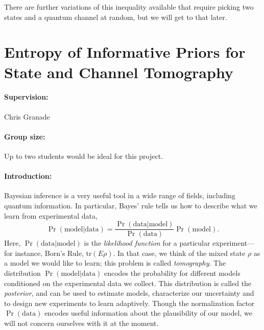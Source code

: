\documentclass[aps,pra,onecolumn,nofootinbib,superscriptaddress,tightenlines,
notitlepage,12pt]{revtex4-1}
\newcommand{\tr}{\mathrm{tr}}
\begin{document}
There are further variations of this inequality available that require picking two states and a quantum channel at random, but we will get to that later. 

\section{Entropy of Informative Priors for State and Channel Tomography}

\paragraph*{Supervision:} Chris Granade

\paragraph*{Group size:} Up to two students would be ideal for this project.

\paragraph*{Introduction:} Bayesian inference is a very useful tool in a wide range of fields, including quantum information. In particular, Bayes' rule tells us how to describe what we learn from experimental data,
\begin{equation}
  \Pr(\text{model} | \text{data}) = \frac{\Pr(\text{data} | \text{model})}{\Pr(\text{data})} \Pr(\text{model}).
\end{equation}
Here, $\Pr(\text{data} | \text{model})$ is the \emph{likelihood function} for
a particular experiment--- for instance, Born's Rule, $\tr(E \rho)$. In that
case, we think of the mixed state $\rho$ as a model we would like to learn;
this problem is called \emph{tomography}. The distribution $\Pr(\text{model} |
\text{data})$ encodes the probability for different models conditioned on the
experimental data we collect. This distribution is called the
\emph{posterior}, and can be used to estimate models, characterize our
uncertainty and to design new experiments to learn adaptively. Though the
normalization factor $\Pr(\text{data})$ encodes useful information about the
plausibility of our model, we will not concern ourselves with it at the moment.
\end{document}
